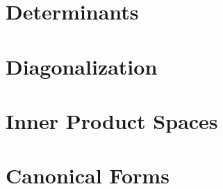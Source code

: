 \documentclass{report}
\theoremstyle{definition}
\begin{document}
\chapter{Determinants}




 

\chapter{Diagonalization}





\chapter{Inner Product Spaces}












\chapter{Canonical Forms}








\end{document}
